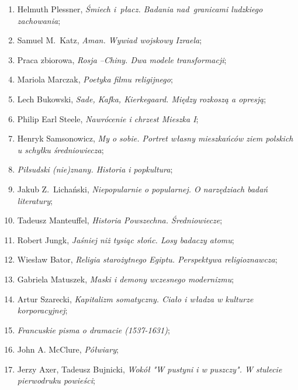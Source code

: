 \documentclass[a4paper,11pt]{article}
\begin{document}
\begin{enumerate}
\item Helmuth Plessner, \emph{Śmiech i~płacz. Badania nad~granicami
    ludzkiego zachowania};

\item Samuel M.~Katz, \emph{Aman. Wywiad wojskowy Izraela};

\item Praca zbiorowa, \emph{Rosja --Chiny. Dwa modele transformacji};

\item Mariola Marczak, \emph{Poetyka filmu religijnego};

\item Lech Bukowski, \emph{Sade, Kafka, Kierkegaard. Między rozkoszą a
    opresją};

\item Philip Earl Steele, \emph{Nawrócenie i chrzest Mieszka I};

\item Henryk Samsonowicz, \emph{My o sobie. Portret własny mieszkańców
    ziem polskich u schyłku średniowiecza};

\item \emph{Piłsudski (nie)znany. Historia i popkultura};

\item Jakub Z.~Lichański, \emph{Niepopularnie o popularnej. O
    narzędziach badań literatury};

\item Tadeusz Manteuffel, \emph{Historia Powszechna. Średniowiecze};

\item Robert Jungk, \emph{Jaśniej niż tysiąc słońc. Losy badaczy
    atomu};

\item Wiesław Bator, \emph{Religia starożytnego Egiptu. Perspektywa
    religioznawcza};

\item Gabriela Matuszek, \emph{Maski i demony wczesnego modernizmu};

\item Artur Szarecki, \emph{Kapitalizm somatyczny. Ciało i władza w
    kulturze korporacyjnej};

\item \emph{Francuskie pisma o dramacie (1537-1631)};

\item John A. McClure, \emph{Półwiary};

\item Jerzy Axer, Tadeusz Bujnicki, \emph{Wokół "W pustyni i
    w puszczy". W stulecie pierwodruku powieści};


\end{enumerate}
\end{document}

